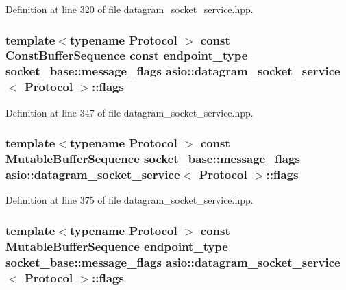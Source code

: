 Definition at line 320 of file datagram\+\_\+socket\+\_\+service.\+hpp.

\hypertarget{classasio_1_1datagram__socket__service_a2ede5958ea4b94d38d693bbf27125c96}{}
\subsubsection[{flags}]{\setlength{\rightskip}{0pt plus 5cm}template$<$typename Protocol $>$ const Const\+Buffer\+Sequence const {\bf endpoint\+\_\+type} {\bf socket\+\_\+base\+::message\+\_\+flags} {\bf asio\+::datagram\+\_\+socket\+\_\+service}$<$ Protocol $>$\+::flags}\label{classasio_1_1datagram__socket__service_a2ede5958ea4b94d38d693bbf27125c96}


Definition at line 347 of file datagram\+\_\+socket\+\_\+service.\+hpp.

\hypertarget{classasio_1_1datagram__socket__service_a30abe6af52922679cdbb1aae33c309d4}{}
\subsubsection[{flags}]{\setlength{\rightskip}{0pt plus 5cm}template$<$typename Protocol $>$ const Mutable\+Buffer\+Sequence {\bf socket\+\_\+base\+::message\+\_\+flags} {\bf asio\+::datagram\+\_\+socket\+\_\+service}$<$ Protocol $>$\+::flags}\label{classasio_1_1datagram__socket__service_a30abe6af52922679cdbb1aae33c309d4}


Definition at line 375 of file datagram\+\_\+socket\+\_\+service.\+hpp.

\hypertarget{classasio_1_1datagram__socket__service_a6d1830e4b29ea3232632dbeafad591d6}{}
\subsubsection[{flags}]{\setlength{\rightskip}{0pt plus 5cm}template$<$typename Protocol $>$ const Mutable\+Buffer\+Sequence {\bf endpoint\+\_\+type} {\bf socket\+\_\+base\+::message\+\_\+flags} {\bf asio\+::datagram\+\_\+socket\+\_\+service}$<$ Protocol $>$\+::flags}\label{classasio_1_1datagram__socket__service_a6d1830e4b29ea3232632dbeafad591d6}


